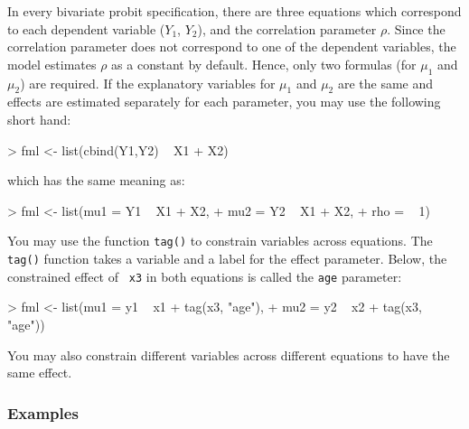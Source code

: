 \documentclass{article}
\begin{document}
In every bivariate probit specification, there are three equations
which correspond to each dependent variable ($Y_1$, $Y_2$), and the
correlation parameter $\rho$.  Since the correlation parameter does
not correspond to one of the dependent variables, the model estimates
$\rho$ as a constant by default.  Hence, only two formulas (for
$\mu_1$ and $\mu_2$) are required.  If the explanatory variables for
$\mu_1$ and $\mu_2$ are the same and effects are estimated separately
for each parameter, you may use the following short hand:  
\begin{Schunk}
\begin{Sinput}
> fml <- list(cbind(Y1,Y2) ~ X1 + X2)
\end{Sinput}
\end{Schunk}
which has the same meaning as:  
\begin{Schunk}
\begin{Sinput}
> fml <- list(mu1 = Y1 ~ X1 + X2,  
+             mu2 = Y2 ~ X1 + X2, 
+             rho = ~ 1)
\end{Sinput}
\end{Schunk}
You may use the function {\tt tag()} to constrain variables across
equations.  The {\tt tag()} function takes a variable and a label for
the effect parameter.  Below, the constrained effect of {\tt
x3} in both equations is called the {\tt age} parameter:  
\begin{Schunk}
\begin{Sinput}
> fml <- list(mu1 = y1 ~ x1 + tag(x3, "age"), 
+             mu2 = y2 ~ x2 + tag(x3, "age"))
\end{Sinput}
\end{Schunk}
You may also constrain different variables across different equations
to have the same effect.  

\subsubsection{Examples}
\end{document}
